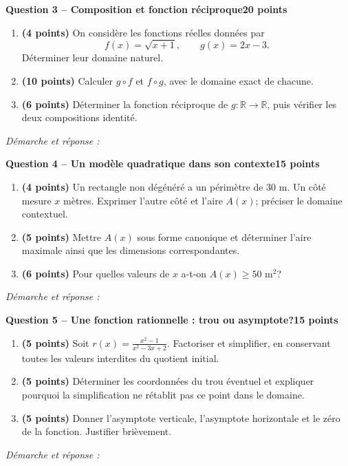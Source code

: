 \documentclass[11pt,a4paper]{article}
\begin{document}
\newpage
{\large\bfseries Question 3 -- Composition et fonction réciproque}\hfill\textbf{20 points}\par
\begin{enumerate}
\item \textbf{(4 points)} On considère les fonctions réelles données par \[f(x)=\sqrt{x+1},\qquad g(x)=2x-3.\] Déterminer leur domaine naturel.
\item \textbf{(10 points)} Calculer \(g\circ f\) et \(f\circ g\), avec le domaine exact de chacune.
\item \textbf{(6 points)} Déterminer la fonction réciproque de \(g:\mathbb R\to\mathbb R\), puis vérifier les deux compositions identité.
\end{enumerate}
\vspace{3mm}\textit{Démarche et réponse :}\par\vfill

\newpage
{\large\bfseries Question 4 -- Un modèle quadratique dans son contexte}\hfill\textbf{15 points}\par
\begin{enumerate}
\item \textbf{(4 points)} Un rectangle non dégénéré a un périmètre de 30 m. Un côté mesure \(x\) mètres. Exprimer l’autre côté et l’aire \(A(x)\); préciser le domaine contextuel.
\item \textbf{(5 points)} Mettre \(A(x)\) sous forme canonique et déterminer l’aire maximale ainsi que les dimensions correspondantes.
\item \textbf{(6 points)} Pour quelles valeurs de \(x\) a-t-on \(A(x)\ge50\) m\(^2\)?
\end{enumerate}
\vspace{3mm}\textit{Démarche et réponse :}\par\vfill

\newpage
{\large\bfseries Question 5 -- Une fonction rationnelle : trou ou asymptote?}\hfill\textbf{15 points}\par
\begin{enumerate}
\item \textbf{(5 points)} Soit \(r(x)=\frac{x^2-1}{x^2-3x+2}\). Factoriser et simplifier, en conservant toutes les valeurs interdites du quotient initial.
\item \textbf{(5 points)} Déterminer les coordonnées du trou éventuel et expliquer pourquoi la simplification ne rétablit pas ce point dans le domaine.
\item \textbf{(5 points)} Donner l’asymptote verticale, l’asymptote horizontale et le zéro de la fonction. Justifier brièvement.
\end{enumerate}
\vspace{3mm}\textit{Démarche et réponse :}\par\vfill
\end{document}
